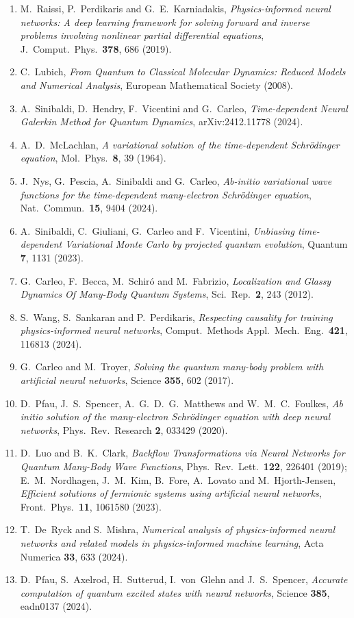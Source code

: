 \documentclass[12pt,a4paper]{article}
\begin{document}
\begin{enumerate}
    \item M.~Raissi, P.~Perdikaris and G.~E.~Karniadakis, \textit{Physics-informed neural networks: A deep learning framework for solving forward and inverse problems involving nonlinear partial differential equations}, J.\ Comput.\ Phys.\ \textbf{378}, 686 (2019).
    \item C.~Lubich, \textit{From Quantum to Classical Molecular Dynamics: Reduced Models and Numerical Analysis}, European Mathematical Society (2008).
    \item A.~Sinibaldi, D.~Hendry, F.~Vicentini and G.~Carleo, \textit{Time-dependent Neural Galerkin Method for Quantum Dynamics}, arXiv:2412.11778 (2024).
    \item A.~D.~McLachlan, \textit{A variational solution of the time-dependent Schr\"odinger equation}, Mol.\ Phys.\ \textbf{8}, 39 (1964).
    \item J.~Nys, G.~Pescia, A.~Sinibaldi and G.~Carleo, \textit{Ab-initio variational wave functions for the time-dependent many-electron Schr\"odinger equation}, Nat.\ Commun.\ \textbf{15}, 9404 (2024).
    \item A.~Sinibaldi, C.~Giuliani, G.~Carleo and F.~Vicentini, \textit{Unbiasing time-dependent Variational Monte Carlo by projected quantum evolution}, Quantum \textbf{7}, 1131 (2023).
    \item G.~Carleo, F.~Becca, M.~Schir\'o and M.~Fabrizio, \textit{Localization and Glassy Dynamics Of Many-Body Quantum Systems}, Sci.\ Rep.\ \textbf{2}, 243 (2012).
    \item S.~Wang, S.~Sankaran and P.~Perdikaris, \textit{Respecting causality for training physics-informed neural networks}, Comput.\ Methods Appl.\ Mech.\ Eng.\ \textbf{421}, 116813 (2024).
    \item G.~Carleo and M.~Troyer, \textit{Solving the quantum many-body problem with artificial neural networks}, Science \textbf{355}, 602 (2017).
    \item D.~Pfau, J.~S.~Spencer, A.~G.~D.~G.~Matthews and W.~M.~C.~Foulkes, \textit{Ab initio solution of the many-electron Schr\"odinger equation with deep neural networks}, Phys.\ Rev.\ Research \textbf{2}, 033429 (2020).
    \item D.~Luo and B.~K.~Clark, \textit{Backflow Transformations via Neural Networks for Quantum Many-Body Wave Functions}, Phys.\ Rev.\ Lett.\ \textbf{122}, 226401 (2019); E.~M.~Nordhagen, J.~M.~Kim, B.~Fore, A.~Lovato and M.~Hjorth-Jensen, \textit{Efficient solutions of fermionic systems using artificial neural networks}, Front.\ Phys.\ \textbf{11}, 1061580 (2023).
    \item T.~De~Ryck and S.~Mishra, \textit{Numerical analysis of physics-informed neural networks and related models in physics-informed machine learning}, Acta Numerica \textbf{33}, 633 (2024).
    \item D.~Pfau, S.~Axelrod, H.~Sutterud, I.~von~Glehn and J.~S.~Spencer, \textit{Accurate computation of quantum excited states with neural networks}, Science \textbf{385}, eadn0137 (2024).
\end{enumerate}
\end{document}
